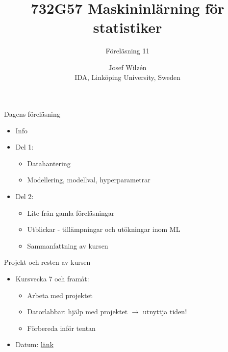 \documentclass[10pt,english]{beamer}
\title{732G57 Maskininlärning för statistiker}
\subtitle{Föreläsning 11}
\date{}
\author{Josef Wilzén \\ IDA, Linköping University, Sweden}
\begin{document}
\maketitle

\begin{frame}{Dagens föreläsning}

    \begin{itemize}
        \item Info
        \item Del 1:
        \begin{itemize}
          \item Datahantering
          \item Modellering, modellval, hyperparametrar  
        \end{itemize}
        \item Del 2:
        \begin{itemize}
          \item Lite från gamla föreläsningar
          \item Utblickar - tillämpningar och utökningar inom ML
          \item Sammanfattning av kursen
        \end{itemize}
    \end{itemize}
    
\end{frame}

\begin{frame}{Projekt och resten av kursen}
    
  \begin{itemize}
        \item Kursvecka 7 och framåt: 
        \begin{itemize}
          \item Arbeta med projektet
          \item Datorlabbar: hjälp med projektet $\rightarrow$ utnyttja tiden!
          \item Förbereda inför tentan
        \end{itemize}
        \item Datum: \href{https://raw.githubusercontent.com/STIMALiU/732G57_ML/refs/heads/main/project/Datum_ht2025.pdf}{länk}
    \end{itemize}

\end{frame}
\end{document}
